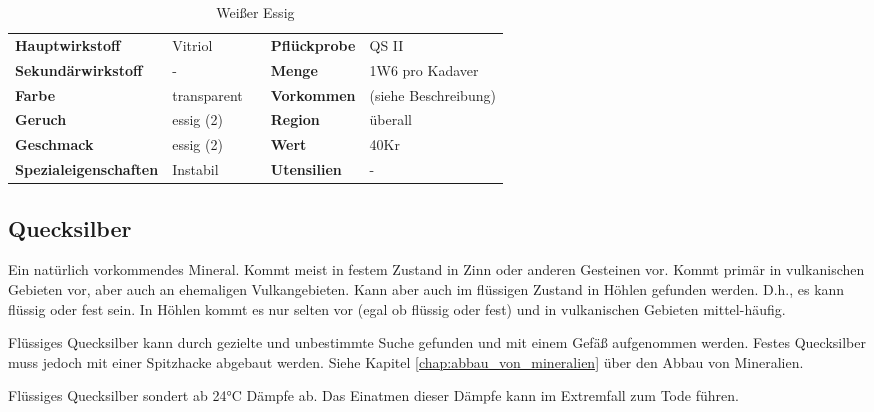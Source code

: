\begin{table}[h] 
\begin{center} 
\begin{tabular}{|l|l|p{1cm}|l|l|} 
  	\cline{1-2} \cline{4-5} 
  	\textbf{Hauptwirkstoff} & Vitriol && \textbf{Pflückprobe} & QS II \\ \cline{1-2} \cline{4-5} 
  	\textbf{Sekundärwirkstoff} & - && \textbf{Menge} & 1W6 pro Kadaver \\ \cline{1-2} \cline{4-5} 
  	\textbf{Farbe} & transparent && \textbf{Vorkommen} & (siehe Beschreibung) \\ \cline{1-2} \cline{4-5} 
  	\textbf{Geruch} & essig (2) && \textbf{Region} & überall \\ \cline{1-2} \cline{4-5} 
  	\textbf{Geschmack} & essig (2) && \textbf{Wert} & 40Kr \\ \cline{1-2} \cline{4-5} 
  	\textbf{Spezialeigenschaften} & Instabil && \textbf{Utensilien} & - \\ \cline{1-2} \cline{4-5} 
\end{tabular} 
\end{center} 
\caption{Weißer Essig} 
\label{tab:weisser_essig} 
\end{table}


\subsection{Quecksilber}
Ein natürlich vorkommendes Mineral. Kommt meist in festem Zustand in Zinn oder anderen Gesteinen vor. Kommt primär in vulkanischen Gebieten vor, aber auch an ehemaligen Vulkangebieten. Kann aber auch im flüssigen Zustand in Höhlen gefunden werden. D.h., es kann flüssig oder fest sein. In Höhlen kommt es nur selten vor (egal ob flüssig oder fest) und in vulkanischen Gebieten mittel-häufig.

Flüssiges Quecksilber kann durch gezielte und unbestimmte Suche gefunden und mit einem Gefäß aufgenommen werden. Festes Quecksilber muss jedoch mit einer Spitzhacke abgebaut werden. Siehe Kapitel \ref{chap:abbau_von_mineralien} über den Abbau von Mineralien.

Flüssiges Quecksilber sondert ab 24°C Dämpfe ab. Das Einatmen dieser Dämpfe kann im Extremfall zum Tode führen.

